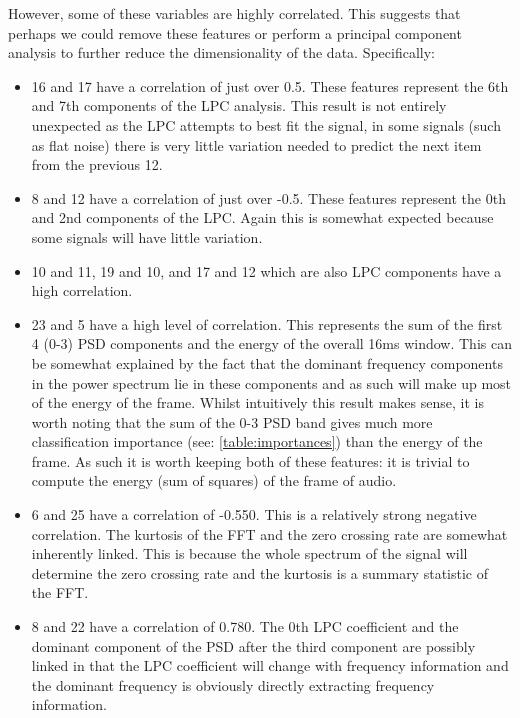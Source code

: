 \documentclass[ %
                    author={Sam Phippen},
                supervisor={Dr. Rafal Bogacz},
                     title={Real time voice activity detectors in noisy personal computing environments},
                  subtitle={},
                    degree={MEng},
                      year={2012} ]{thesis}
\begin{document}
However, some of these variables are highly correlated. This suggests that
perhaps we could remove these features or perform a principal component
analysis to further reduce the dimensionality of the data. Specifically:

\begin{itemize}

    \item 16 and 17 have a correlation of just over 0.5. These features
        represent the 6th and 7th components of the LPC analysis. This result
        is not entirely unexpected as the LPC attempts to best fit the signal,
        in some signals (such as flat noise) there is very little variation
        needed to predict the next item from the previous 12.

    \item 8 and 12 have a correlation of just over -0.5. These features
        represent the 0th and 2nd components of the LPC. Again this is somewhat
        expected because some signals will have little variation.

    \item 10 and 11, 19 and 10, and 17 and 12 which are also LPC components
        have a high correlation.

    \item 23 and 5 have a high level of correlation. This represents the sum of
        the first 4 (0-3) PSD components and the energy of the overall 16ms
        window. This can be somewhat explained by the fact that the dominant
        frequency components in the power spectrum lie in these components and
        as such will make up most of the energy of the frame. Whilst
        intuitively this result makes sense, it is worth noting that the sum of
        the 0-3 PSD band gives much more classification importance (see:
        \ref{table:importances}) than the energy of the frame. As such it is
        worth keeping both of these features: it is trivial to compute the
        energy (sum of squares) of the frame of audio.

    \item 6 and 25 have a correlation of -0.550. This is a relatively strong
        negative correlation. The kurtosis of the FFT and the zero crossing
        rate are somewhat inherently linked. This is because the whole spectrum
        of the signal will determine the zero crossing rate and the kurtosis
        is a summary statistic of the FFT.

    \item 8 and 22 have a correlation of 0.780. The 0th LPC coefficient and the
        dominant component of the PSD after the third component are possibly
        linked in that the LPC coefficient will change with frequency
        information and the dominant frequency is obviously directly extracting
        frequency information.


\end{itemize}
\end{document}
